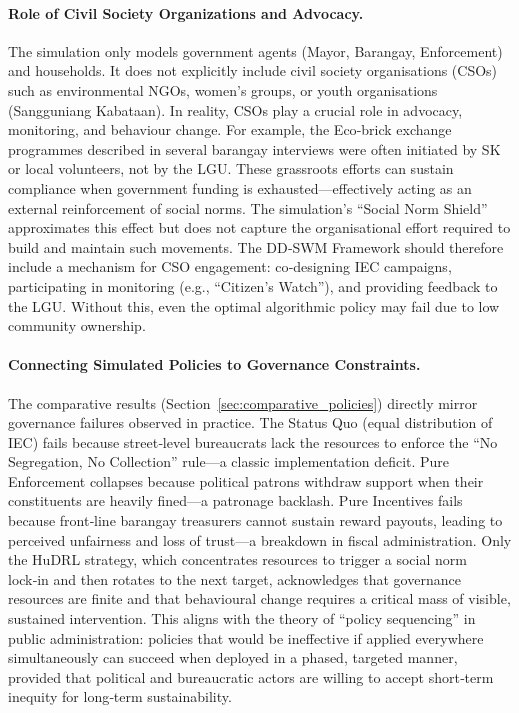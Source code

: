 \paragraph{Role of Civil Society Organizations and Advocacy.}
The simulation only models government agents (Mayor, Barangay, Enforcement) and households. It does not explicitly include civil society organisations (CSOs) such as environmental NGOs, women’s groups, or youth organisations (Sangguniang Kabataan). In reality, CSOs play a crucial role in advocacy, monitoring, and behaviour change. For example, the Eco‑brick exchange programmes described in several barangay interviews were often initiated by SK or local volunteers, not by the LGU. These grassroots efforts can sustain compliance when government funding is exhausted—effectively acting as an external reinforcement of social norms. The simulation’s “Social Norm Shield” approximates this effect but does not capture the organisational effort required to build and maintain such movements. The DD‑SWM Framework should therefore include a mechanism for CSO engagement: co‑designing IEC campaigns, participating in monitoring (e.g., “Citizen’s Watch”), and providing feedback to the LGU. Without this, even the optimal algorithmic policy may fail due to low community ownership.

\paragraph{Connecting Simulated Policies to Governance Constraints.}
The comparative results (Section~\ref{sec:comparative_policies}) directly mirror governance failures observed in practice. The Status Quo (equal distribution of IEC) fails because street‑level bureaucrats lack the resources to enforce the “No Segregation, No Collection” rule—a classic implementation deficit. Pure Enforcement collapses because political patrons withdraw support when their constituents are heavily fined—a patronage backlash. Pure Incentives fails because front‑line barangay treasurers cannot sustain reward payouts, leading to perceived unfairness and loss of trust—a breakdown in fiscal administration. Only the HuDRL strategy, which concentrates resources to trigger a social norm lock‑in and then rotates to the next target, acknowledges that governance resources are finite and that behavioural change requires a critical mass of visible, sustained intervention. This aligns with the theory of “policy sequencing” in public administration: policies that would be ineffective if applied everywhere simultaneously can succeed when deployed in a phased, targeted manner, provided that political and bureaucratic actors are willing to accept short‑term inequity for long‑term sustainability.


